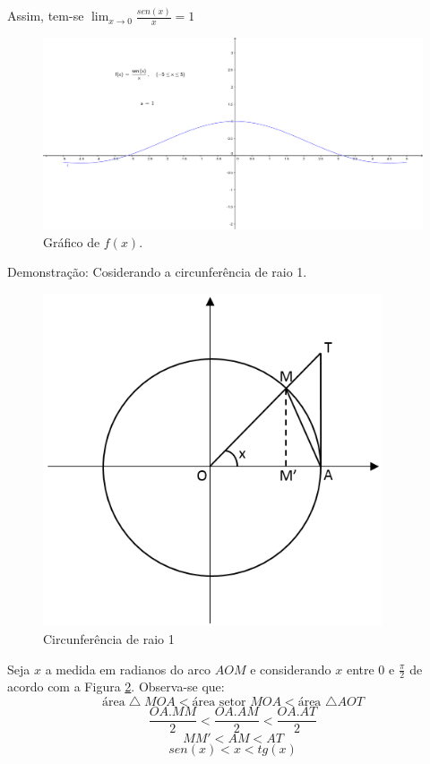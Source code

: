 Assim, tem-se $\displaystyle \lim_{x \to 0} \frac{sen(x)}{x} = 1$\\
\begin{figure}[H]
\centering %
\includegraphics[width=15cm]{img/graph8.png} %
\caption{Gráfico de $f(x)$.}
\label{fig:graph8}
\end{figure}
Demonstração: Cosiderando a circunferência de raio 1.
\begin{figure}[H]
\centering %
\includegraphics[width=10cm]{img/img1.png} %
\caption{Circunferência de raio 1}
\label{fig:circ1}
\end{figure}

Seja $x$ a medida em radianos do arco ${AOM}$ e considerando $x$ entre 0 e $\displaystyle \frac{\pi}{2}$ de acordo com a Figura \ref{fig:circ1}. Observa-se que:
$$
\textrm{área} \bigtriangleup MOA <  \textrm{área setor $MOA$}  < \textrm{área $\bigtriangleup  AOT$}
$$
$$
\frac{OA.MM}{2} < \frac{OA . AM}{2} < \frac{OA . AT}{2}
$$
$$
MM' < AM < AT
$$
$$
sen (x) < x < tg(x)
$$

